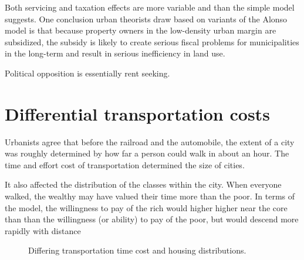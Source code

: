 Both servicing and taxation effects are more variable and than the simple model suggests.  One conclusion urban theorists draw based on variants of the Alonso model is that because property owners in the low-density urban margin are subsidized,  the subsidy is likely to create serious fiscal problems for municipalities in the long-term and result in serious inefficiency in land use.

Political opposition is essentially rent seeking.

\section{Differential transportation costs}
 Urbanists agree that before the railroad and the automobile, the extent of a city was roughly determined by how far a person could walk in about an hour. The time and effort cost of transportation determined the size of cities. 
 
 It also affected the distribution of the classes within the city. When everyone walked, the  wealthy may have valued their time more than the poor. In terms of the model, the willingness to pay of the rich would higher higher near the core than than the willingness (or ability) to pay of  the poor, but would descend more rapidly with distance
\begin{figure}
\begin{center}
\end{center}
\caption{Differing transportation time cost and housing distributions.}
\end{figure}

